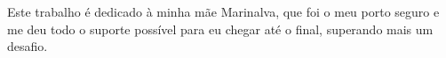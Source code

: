
\begin{dedicatoria}
   \vspace*{\fill}
   	\begin{flushright}
   \noindent
   Este trabalho é dedicado à minha mãe Marinalva, que foi o meu porto seguro e me deu todo o suporte possível para eu chegar até o final, superando mais um desafio.
   	\end{flushright}
\end{dedicatoria}
